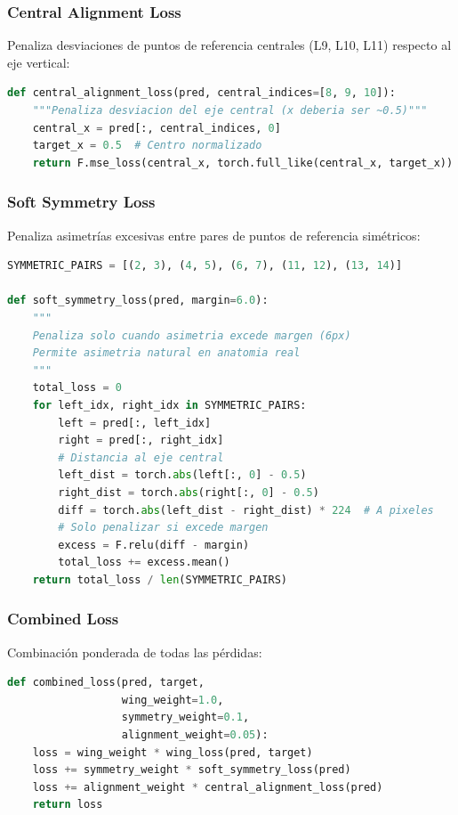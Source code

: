 \documentclass[12pt,a4paper]{article}
\begin{document}
\subsubsection{Central Alignment Loss}

Penaliza desviaciones de puntos de referencia centrales (L9, L10, L11) respecto al eje vertical:

\begin{lstlisting}[language=Python]
def central_alignment_loss(pred, central_indices=[8, 9, 10]):
    """Penaliza desviacion del eje central (x deberia ser ~0.5)"""
    central_x = pred[:, central_indices, 0]
    target_x = 0.5  # Centro normalizado
    return F.mse_loss(central_x, torch.full_like(central_x, target_x))
\end{lstlisting}

\subsubsection{Soft Symmetry Loss}

Penaliza asimetrías excesivas entre pares de puntos de referencia simétricos:

\begin{lstlisting}[language=Python]
SYMMETRIC_PAIRS = [(2, 3), (4, 5), (6, 7), (11, 12), (13, 14)]

def soft_symmetry_loss(pred, margin=6.0):
    """
    Penaliza solo cuando asimetria excede margen (6px)
    Permite asimetria natural en anatomia real
    """
    total_loss = 0
    for left_idx, right_idx in SYMMETRIC_PAIRS:
        left = pred[:, left_idx]
        right = pred[:, right_idx]
        # Distancia al eje central
        left_dist = torch.abs(left[:, 0] - 0.5)
        right_dist = torch.abs(right[:, 0] - 0.5)
        diff = torch.abs(left_dist - right_dist) * 224  # A pixeles
        # Solo penalizar si excede margen
        excess = F.relu(diff - margin)
        total_loss += excess.mean()
    return total_loss / len(SYMMETRIC_PAIRS)
\end{lstlisting}

\subsubsection{Combined Loss}

Combinación ponderada de todas las pérdidas:

\begin{lstlisting}[language=Python]
def combined_loss(pred, target,
                  wing_weight=1.0,
                  symmetry_weight=0.1,
                  alignment_weight=0.05):
    loss = wing_weight * wing_loss(pred, target)
    loss += symmetry_weight * soft_symmetry_loss(pred)
    loss += alignment_weight * central_alignment_loss(pred)
    return loss
\end{lstlisting}
\end{document}
